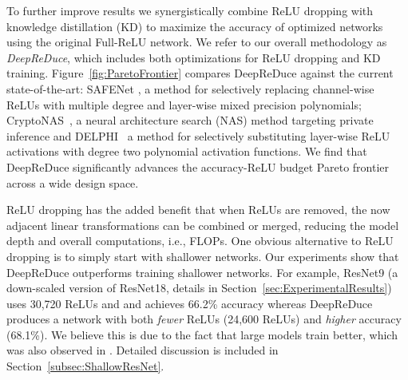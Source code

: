 To further improve results we synergistically combine ReLU dropping with knowledge distillation (KD) \cite{hinton2015distilling,wang2021knowledge} to maximize the accuracy of optimized networks using the original Full-ReLU network.
We refer to our overall methodology as \emph{DeepReDuce}, 
which includes both optimizations for ReLU dropping and KD training.
Figure~\ref{fig:ParetoFrontier} compares DeepReDuce against the current state-of-the-art: 
SAFENet \cite{lou2021safenet}, a method for selectively replacing channel-wise ReLUs with multiple degree and layer-wise mixed precision polynomials;
CryptoNAS~\cite{ghodsi2020cryptonas}, a neural architecture search (NAS) method targeting private inference and 
DELPHI~\cite{mishra2020delphi} a method for selectively substituting layer-wise ReLU activations with degree two polynomial activation functions.
We find that DeepReDuce significantly advances the accuracy-ReLU budget Pareto frontier across a wide design space.

ReLU dropping has the added benefit that
when ReLUs are removed, the now adjacent linear transformations can be combined or merged, 
reducing the model depth and overall computations, i.e., FLOPs.
One obvious alternative to ReLU dropping is to simply start with shallower networks.
Our experiments show that DeepReDuce outperforms training shallower networks.
For example, ResNet9 (a down-scaled version of ResNet18, details in Section~\ref{sec:ExperimentalResults}) uses 30,720 ReLUs and and achieves 66.2\% accuracy 
whereas DeepReDuce produces a network with both \emph{fewer} ReLUs (24,600 ReLUs) and \emph{higher} accuracy (68.1\%).
We believe this is due to the fact that large models train better, 
which was also observed in \cite{zhao2018reThinking}. Detailed discussion is included in Section~\ref{subsec:ShallowResNet}.


